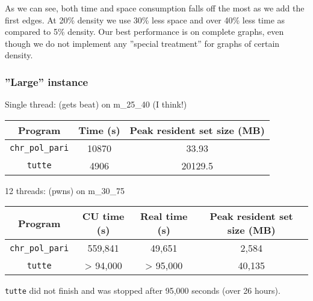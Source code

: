\documentclass[a4paper]{article}
\newcommand{\code}{\texttt}
\begin{document}
As we can see, both time and space consumption falls off the most as we add the first edges. At 20\% density we use 30\% less space and over 40\% less time as compared to 5\% density. Our best performance is on complete graphs, even though we do not implement any ''special treatment'' for graphs of certain density.

\subsubsection{''Large'' instance}
Single thread: (gets beat) on m\_25\_40 (I think!) %
\begin{center}
 \begin{tabular}{|c|c|c|} \hline
  Program & Time (s) & Peak resident set size (MB) \\ \hline
  \code{chr\_pol\_pari} & 10870 & 33.93 \\ \hline
  \code{tutte} & 4906 & 20129.5 \\ \hline
 \end{tabular}

\end{center}

12 threads: (pwns) on m\_30\_75

\begin{center}
 \begin{tabular}{|c|c|c|c|} \hline
  Program & CU time (s) & Real time (s) & Peak resident set size (MB) \\ \hline
  \code{chr\_pol\_pari} & 559,841 & 49,651 & 2,584 \\ \hline
  \code{tutte} & > 94,000 & > 95,000 & 40,135 \\ \hline
 \end{tabular}

\end{center}

\code{tutte} did not finish and was stopped after 95,000 seconds (over 26 hours).


\end{document}
